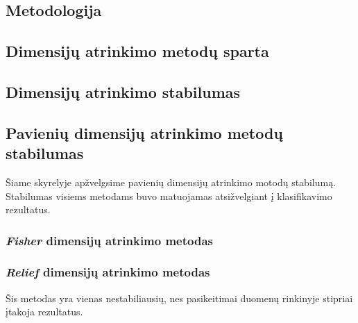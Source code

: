 \subsection{Metodologija}

\subsection{Dimensijų atrinkimo metodų sparta}

\subsection{Dimensijų atrinkimo stabilumas}

\subsection{Pavienių dimensijų atrinkimo metodų stabilumas}

Šiame skyrelyje apžvelgsime pavienių dimensijų atrinkimo motodų stabilumą. 
Stabilumas visiems metodams buvo matuojamas atsižvelgiant į klasifikavimo
rezultatus.

\subsubsection{\textit{Fisher} dimensijų atrinkimo metodas}

\subsubsection{\textit{Relief} dimensijų atrinkimo metodas}

Šis metodas yra vienas nestabiliausių, nes pasikeitimai duomenų rinkinyje 
stipriai įtakoja rezultatus.